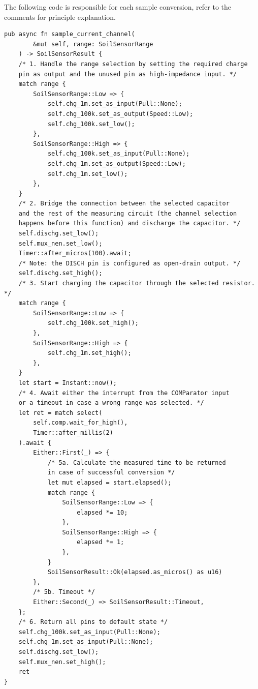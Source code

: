 The following code is responsible for each sample conversion, refer to the comments for principle explanation.
\newpage
\begin{lstlisting}
pub async fn sample_current_channel(
        &mut self, range: SoilSensorRange
    ) -> SoilSensorResult {
    /* 1. Handle the range selection by setting the required charge 
    pin as output and the unused pin as high-impedance input. */
    match range {
        SoilSensorRange::Low => {
            self.chg_1m.set_as_input(Pull::None);
            self.chg_100k.set_as_output(Speed::Low);
            self.chg_100k.set_low();
        },
        SoilSensorRange::High => {
            self.chg_100k.set_as_input(Pull::None);
            self.chg_1m.set_as_output(Speed::Low);
            self.chg_1m.set_low();
        },
    }
    /* 2. Bridge the connection between the selected capacitor 
    and the rest of the measuring circuit (the channel selection 
    happens before this function) and discharge the capacitor. */
    self.dischg.set_low();
    self.mux_nen.set_low();
    Timer::after_micros(100).await;
    /* Note: the DISCH pin is configured as open-drain output. */
    self.dischg.set_high();
    /* 3. Start charging the capacitor through the selected resistor. */
    match range {
        SoilSensorRange::Low => {
            self.chg_100k.set_high();
        },
        SoilSensorRange::High => {
            self.chg_1m.set_high();
        },
    }
    let start = Instant::now();
    /* 4. Await either the interrupt from the COMParator input
    or a timeout in case a wrong range was selected. */
    let ret = match select(
        self.comp.wait_for_high(), 
        Timer::after_millis(2)
    ).await {
        Either::First(_) => {
            /* 5a. Calculate the measured time to be returned 
            in case of successful conversion */
            let mut elapsed = start.elapsed();
            match range {
                SoilSensorRange::Low => {
                    elapsed *= 10;
                },
                SoilSensorRange::High => {
                    elapsed *= 1;
                },
            }
            SoilSensorResult::Ok(elapsed.as_micros() as u16)
        },
        /* 5b. Timeout */
        Either::Second(_) => SoilSensorResult::Timeout,
    };
    /* 6. Return all pins to default state */
    self.chg_100k.set_as_input(Pull::None);
    self.chg_1m.set_as_input(Pull::None);
    self.dischg.set_low();
    self.mux_nen.set_high();
    ret
}
\end{lstlisting}

\FloatBarrier
